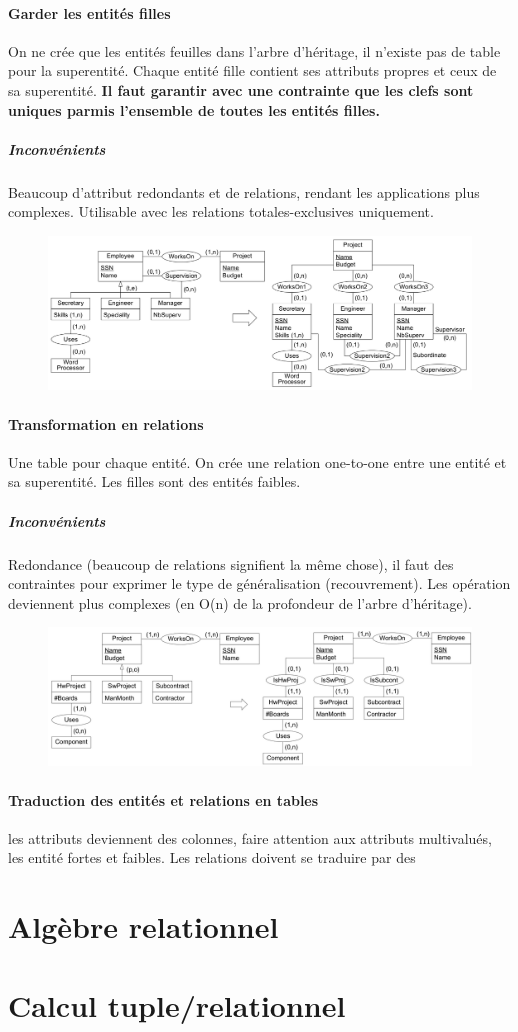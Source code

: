 \documentclass[a4paper]{article}
\begin{document}
\paragraph{Garder les entités filles}
On ne crée que les entités feuilles dans l'arbre d'héritage, il n'existe pas de
table pour la superentité. Chaque entité fille contient ses attributs propres et
ceux de sa superentité. \textbf{Il faut garantir avec une contrainte que les
clefs sont uniques parmis l'ensemble de toutes les entités filles.}
\subparagraph{Inconvénients}
Beaucoup d'attribut redondants et de relations, rendant les applications plus complexes.
Utilisable avec les relations totales-exclusives uniquement.
\begin{figure}[H]
    \center
    \includegraphics[width=.9\textwidth]{fig/er2rm-2.png}
\end{figure}

\paragraph{Transformation en relations}
Une table pour chaque entité. On crée une relation one-to-one entre une entité
et sa superentité. Les filles sont des entités faibles.
\subparagraph{Inconvénients}
Redondance (beaucoup de relations signifient la même chose), il faut des contraintes
pour exprimer le type de généralisation (recouvrement). Les opération deviennent plus
complexes (en O(n) de la profondeur de l'arbre d'héritage).
\begin{figure}[H]
    \center
    \includegraphics[width=.9\textwidth]{fig/er2rm-3.png}
\end{figure}

\paragraph{Traduction des entités et relations en tables} les attributs deviennent
des colonnes, faire attention aux attributs multivalués, les entité fortes et faibles.
Les relations doivent se traduire par des 



\section{Algèbre relationnel}


\section{Calcul tuple/relationnel}
\end{document}

